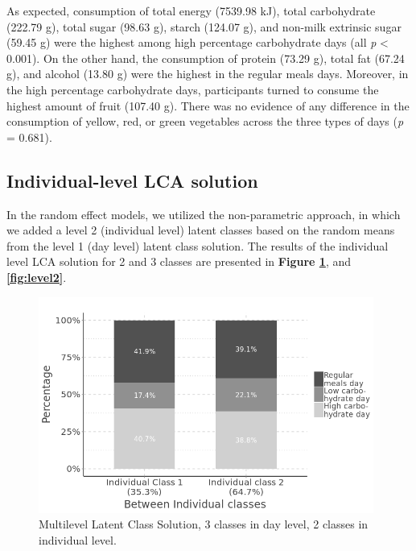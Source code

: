 As expected, consumption of total energy (7539.98 kJ), total carbohydrate (222.79 g), total sugar (98.63 g), starch (124.07 g), and non-milk extrinsic sugar (59.45 g) were the highest among high percentage carbohydrate days (all \textit{p} < 0.001). On the other hand, the consumption of protein (73.29 g), total fat (67.24 g), and alcohol (13.80 g) were the highest in the regular meals days. Moreover, in the high percentage carbohydrate days, participants turned to consume the highest amount of fruit (107.40 g). There was no evidence of any difference in the consumption of yellow, red, or green vegetables across the three types of days (\textit{p} = 0.681).\vspace{-0.6cm}


\subsection{Individual-level LCA solution}\vspace{-0.3cm}

In the random effect models, we utilized the non-parametric approach, in which we added a level 2 (individual level) latent classes based on the random means from the level 1 (day level) latent class solution. The results of the individual level LCA solution for 2 and 3 classes are presented in \textbf{Figure \ref{fig:CB2level2}}, and \textbf{\ref{fig:level2}}. 


\begin{figure}[H]
	\centering
	\includegraphics[width=11cm]{Figures/CB2level2.png}
	\decoRule
	\caption[Multilevel Latent Class Solution ($3\times2$).]{Multilevel Latent Class Solution, 3 classes in day level, 2 classes in individual level.}
	\label{fig:CB2level2}
\end{figure}

